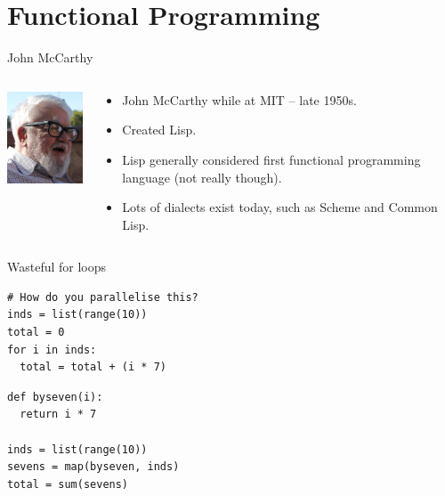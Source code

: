 \section{Functional Programming}
\begin{frame}{John McCarthy}
  \begin{columns}
    \begin{column}{0.2\textwidth}
      \includegraphics[width=1.2in]{img/john-mccarthy.png}
    \end{column}
    \begin{column}{0.68\textwidth}
      \begin{itemize}
        \item John McCarthy while at MIT -- late 1950s.
        \vspace{0.25cm}
        \item Created Lisp.
        \vspace{0.25cm}
        \item Lisp generally considered first functional programming language (not really though).
        \vspace{0.25cm}
        \item Lots of dialects exist today, such as Scheme and Common Lisp.
      \end{itemize}
    \end{column}
  \end{columns}
\end{frame}

\begin{frame}[fragile]{Wasteful for loops}
  \begin{verbatim}
# How do you parallelise this?
inds = list(range(10))
total = 0
for i in inds:
  total = total + (i * 7)
  \end{verbatim}
  \begin{verbatim}
def byseven(i):
  return i * 7

inds = list(range(10))
sevens = map(byseven, inds)
total = sum(sevens)
  \end{verbatim}
\end{frame}

